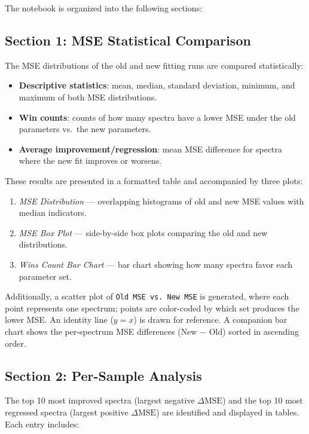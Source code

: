 \documentclass[12pt,a4paper]{article}
\begin{document}
The notebook is organized into the following sections:

\subsection{Section 1: MSE Statistical Comparison}

The MSE distributions of the old and new fitting runs are compared statistically:

\begin{itemize}[noitemsep]
    \item \textbf{Descriptive statistics}: mean, median, standard deviation, minimum, and maximum of both MSE distributions.
    \item \textbf{Win counts}: counts of how many spectra have a lower MSE under the old parameters vs.\ the new parameters.
    \item \textbf{Average improvement/regression}: mean MSE difference for spectra where the new fit improves or worsens.
\end{itemize}

These results are presented in a formatted table and accompanied by three plots:
\begin{enumerate}[noitemsep]
    \item \textit{MSE Distribution} --- overlapping histograms of old and new MSE values with median indicators.
    \item \textit{MSE Box Plot} --- side-by-side box plots comparing the old and new distributions.
    \item \textit{Wins Count Bar Chart} --- bar chart showing how many spectra favor each parameter set.
\end{enumerate}

Additionally, a scatter plot of \texttt{Old MSE vs.\ New MSE} is generated, where each point represents one spectrum; points are color-coded by which set produces the lower MSE. An identity line ($y = x$) is drawn for reference. A companion bar chart shows the per-spectrum MSE differences (New $-$ Old) sorted in ascending order.

\subsection{Section 2: Per-Sample Analysis}

The top 10 most improved spectra (largest negative $\Delta\text{MSE}$) and the top 10 most regressed spectra (largest positive $\Delta\text{MSE}$) are identified and displayed in tables. Each entry includes:
\end{document}

